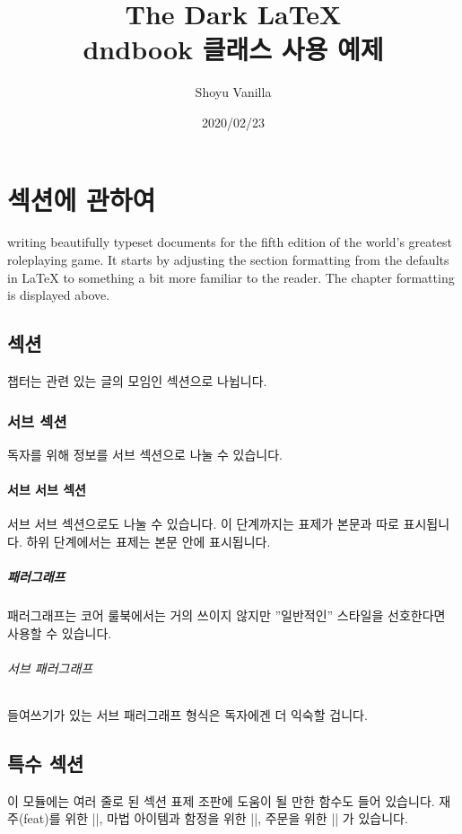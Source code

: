 \documentclass[letterpaper,twocolumn,openany,nodeprecatedcode]{dndbook}
\title{The Dark \LaTeX{} \\
\large dndbook 클래스 사용 예제}
\author{Shoyu Vanilla}
\date{2020/02/23}
\begin{document}
\frontmatter

\maketitle

\tableofcontents

\mainmatter%

\chapter{섹션에 관하여}

 writing beautifully typeset documents for the fifth edition of the world's greatest roleplaying game. It starts by adjusting the section formatting from the defaults in \LaTeX{} to something a bit more familiar to the reader. The chapter formatting is displayed above.

\section{섹션}
챕터는 관련 있는 글의 모임인 섹션으로 나뉩니다.

\subsection{서브 섹션}
독자를 위해 정보를 서브 섹션으로 나눌 수 있습니다.

\subsubsection{서브 서브 섹션}
서브 서브 섹션으로도 나눌 수 있습니다. 이 단계까지는 표제가 본문과 따로 표시됩니다. 하위 단계에서는 표제는 본문 안에 표시됩니다.

\paragraph{패러그래프}
패러그래프는 코어 룰북에서는 거의 쓰이지 않지만 ''일반적인'' 스타일을 선호한다면 사용할 수 있습니다.

\subparagraph{서브 패러그래프}
들여쓰기가 있는 서브 패러그래프 형식은 독자에겐 더 익숙할 겁니다.

\section{특수 섹션}
이 모듈에는 여러 줄로 된 섹션 표제 조판에 도움이 될 만한 함수도 들어 있습니다. 재주(feat)를 위한 |\DndFeatHeader|, 마법 아이템과 함정을 위한 |\DndItemHeader|, 주문을 위한 |\DndSpellHeader| 가 있습니다.
\end{document}
